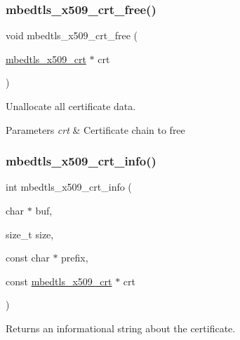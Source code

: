 \subsubsection{\texorpdfstring{mbedtls\+\_\+x509\+\_\+crt\+\_\+free()}{mbedtls\_x509\_crt\_free()}}
{\footnotesize\ttfamily void mbedtls\+\_\+x509\+\_\+crt\+\_\+free (\begin{DoxyParamCaption}\item[{\mbox{\hyperlink{structmbedtls__x509__crt}{mbedtls\+\_\+x509\+\_\+crt}} $\ast$}]{crt }\end{DoxyParamCaption})}



Unallocate all certificate data. 


\begin{DoxyParams}{Parameters}
{\em crt} & Certificate chain to free \\
\hline
\end{DoxyParams}
\mbox{\label{group__x509__module_gabaf30f2269fc3b6608b25871f9d09da6}} 
\subsubsection{\texorpdfstring{mbedtls\+\_\+x509\+\_\+crt\+\_\+info()}{mbedtls\_x509\_crt\_info()}}
{\footnotesize\ttfamily int mbedtls\+\_\+x509\+\_\+crt\+\_\+info (\begin{DoxyParamCaption}\item[{char $\ast$}]{buf,  }\item[{size\+\_\+t}]{size,  }\item[{const char $\ast$}]{prefix,  }\item[{const \mbox{\hyperlink{structmbedtls__x509__crt}{mbedtls\+\_\+x509\+\_\+crt}} $\ast$}]{crt }\end{DoxyParamCaption})}



Returns an informational string about the certificate. 


